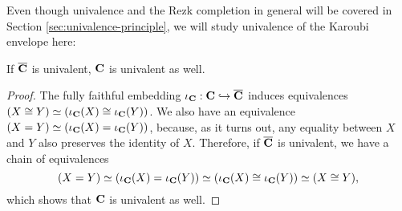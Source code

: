 Even though univalence and the Rezk completion in general will be covered in Section \ref{sec:univalence-principle}, we will study univalence of the Karoubi envelope here:

\begin{lemma}\label{rem:karoubi-univalent}
  If $ \overline {\mathbf{C}} $ is univalent, $ \mathbf{C} $ is univalent as well.
\end{lemma}
\begin{proof}
  The fully faithful embedding $ \iota_{\mathbf{C}} : \mathbf{C} \hookrightarrow \overline {\mathbf{C}} $ induces equivalences $ (X \cong Y) \simeq (\iota_{\mathbf{C}}(X) \cong \iota_{\mathbf{C}}(Y)) $. We also have an equivalence $ (X = Y) \simeq (\iota_{\mathbf{C}}(X) = \iota_{\mathbf{C}}(Y)) $, because, as it turns out, any equality between $ X $ and $ Y $ also preserves the identity of $ X $. Therefore, if $ \overline {\mathbf{C}} $ is univalent, we have a chain of equivalences
  \[ (X = Y) \simeq (\iota_{\mathbf{C}}(X) = \iota_{\mathbf{C}}(Y)) \simeq (\iota_{\mathbf{C}}(X) \cong \iota_{\mathbf{C}}(Y)) \simeq (X \cong Y), \]
  which shows that $ \mathbf{C} $ is univalent as well.
\end{proof}


